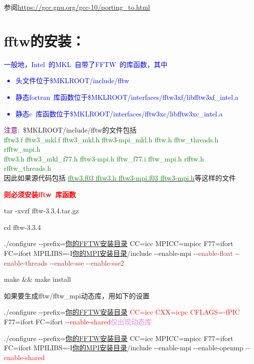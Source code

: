 \documentclass[10pt,a4paper]{article}
\begin{document}
参阅\url{https://gcc.gnu.org/gcc-10/porting_to.html}

\section{fftw的安装：}
\textcolor{blue}{一般地，\textrm{Intel~}的\textrm{MKL~}自带了\textrm{FFTW~}的库函数，其中
\begin{itemize}
	\item 头文件位于\;\$MKLROOT/include/fftw
	\item 静态\textrm{fortran~}库函数位于\;\$MKLROOT/interfaces/fftw3xf/libfftw3xf\_intel.a
	\item 静态\textrm{c~}库函数位于\;\$MKLROOT/interfaces/fftw3xc/libfftw3xc\_intel.a
\end{itemize}}

\textcolor{purple}{注意:~}\$MKLROOT/include/fftw的文件包括\\
\textcolor{green}{fftw3.f\;\;  fftw3\_mkl.f\;\;   fftw3\_mkl.h\;\;  fftw3-mpi\_mkl.h\;\;  fftw.h \;\;    fftw\_threads.h\;\;  rfftw\_mpi.h \\
	fftw3.h\;\;  fftw3\_mkl\_f77.h\;\;  fftw3-mpi.h\;\;  fftw\_f77.i \;\;      fftw\_mpi.h \;\; rfftw.h  \;\;       rfftw\_threads.h
}\\
因此如果源代码包括 \underline{\textcolor{green}{fftw3.f03\;\; fftw3.h\;\; fftw3-mpi.f03\;\; fftw3-mpi.h}}等这样的文件

\textbf{\textcolor{red}{则必须安装\textrm{fftw~}库函数}}


tar -xvzf fftw-3.3.4.tar.gz

cd fftw-3.3.4

./configure -\/-prefix=\underline{你的FFTW安装目录} CC=icc MPICC=mpicc F77=ifort FC=ifort MPILIBS=-I\underline{你的MPI安装目录}/include -\/-enable-mpi \textcolor{brown}{-\/-enable-float -\/-enable-threads -\/-enable-sse -\/-enable-sse2}

make \&\& make install

如果要生成\textrm{fftw/fftw\_mpi}动态库，用如下的设置

./configure -\/-prefix=\underline{你的FFTW安装目录} \textcolor{red}{CC=icc CXX=icpc CFLAGS=-fPIC} F77=ifort FC=ifort \textcolor{red}{-\/-enable-shared}\;\;\;\textcolor{violet}{仅出现动态库}

./configure -\/-prefix=\underline{你的FFTW安装目录} CC=icc MPICC=mpicc F77=ifort FC=ifort MPILIBS=-I\underline{你的MPI安装目录}/include -\/-enable-mpi -\/-enable-openmp \textcolor{red}{-\/-enable-shared}
\end{document}
